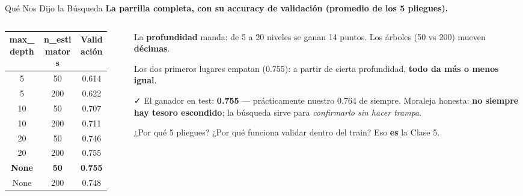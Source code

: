 \documentclass[aspectratio=169, 11pt]{beamer}
\begin{document}
\begin{frame}[shrink=10]{Qué Nos Dijo la Búsqueda}
  \vspace{-4pt}
  {\small\color{arcaDark}\bfseries
    La parrilla completa, con su accuracy de validación (promedio de los 5 pliegues).}

  \vspace{6pt}
  \begin{columns}[T]
    \begin{column}{0.46\textwidth}
      {\footnotesize
      \begin{tabular}{@{}ccc@{}}
        \toprule
        {\color{arcaDark}\bfseries max\_depth} & {\color{arcaDark}\bfseries n\_estimators}
          & {\color{arcaDark}\bfseries Validación} \\
        \midrule
        5 & 50 & 0.614 \\
        5 & 200 & 0.622 \\
        10 & 50 & 0.707 \\
        10 & 200 & 0.711 \\
        20 & 50 & 0.746 \\
        20 & 200 & 0.755 \\
        \rowcolor{arcaGray}
        \textbf{None} & \textbf{50} & \textbf{0.755} \\
        None & 200 & 0.748 \\
        \bottomrule
      \end{tabular}
      }
    \end{column}
    \begin{column}{0.5\textwidth}
      {\scriptsize\color{textMuted}
      \begin{itemize}\setlength{\itemsep}{5pt}
        \item[{\color{arcaRed}\scriptsize\faArrowRight}]
          La \textbf{profundidad} manda: de 5 a 20 niveles se ganan
          14 puntos. Los árboles (50 vs 200) mueven \textbf{décimas}.
        \item[{\color{arcaRed}\scriptsize\faEye}]
          Los dos primeros lugares empatan (0.755): a partir de
          cierta profundidad, \textbf{todo da más o menos igual}.
        \item[{\color{codeGreen}\scriptsize\faCheck}]
          El ganador en test: \textbf{0.755} --- prácticamente
          nuestro 0.764 de siempre. Moraleja honesta: \textbf{no siempre
          hay tesoro escondido}; la búsqueda sirve para \emph{confirmarlo
          sin hacer trampa}.
        \item[{\color{arcaRed}\scriptsize\faQuestionCircle}]
          ¿Por qué 5 pliegues? ¿Por qué funciona validar dentro del
          train? Eso \textbf{es} la Clase 5.
      \end{itemize}
      }
    \end{column}
  \end{columns}
\end{frame}
\end{document}

